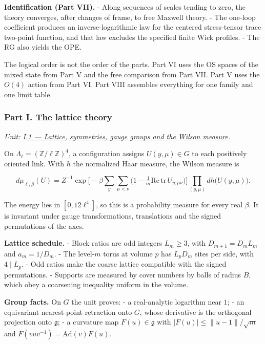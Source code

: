 \documentclass[
  letterpaper,
  11pt]{article}
\begin{document}
\textbf{Identification (Part VII).} - Along sequences of scales tending
to zero, the theory converges, after changes of frame, to free Maxwell
theory. - The one-loop coefficient produces an inverse-logarithmic law
for the centered stress-tensor trace two-point function, and that law
excludes the specified finite Wick profiles. - The RG also yields the
OPE.

The logical order is not the order of the parts. Part VI uses the OS
spaces of the mixed state from Part V and the free comparison from Part
VII. Part V uses the \(O(4)\) action from Part VI. Part VIII assembles
everything for one family and one limit table.

\subsubsection{Part I. The lattice
theory}\label{part-i.-the-lattice-theory}

\emph{Unit:
\href{https://github.com/scottnarmstrong/yang-mills-informalization/blob/main/outline/units/I-1.md}{I.1
--- Lattice, symmetries, gauge groups and the Wilson measure}.}

On \(\Lambda_\ell=(\mathbb Z/\ell\mathbb Z)^4\), a configuration assigns
\(U(y,\mu)\in G\) to each positively oriented link. With \(h\) the
normalized Haar measure, the Wilson measure is

\[d\mu_{\ell,\beta}(U)=Z^{-1}\exp\Big[-\beta\sum_y\sum_{\mu<\nu}\big(1-\tfrac1m\mathrm{Re}\,\mathrm{tr}\,U_{y;\mu\nu}\big)\Big]\prod_{(y,\mu)}dh\big(U(y,\mu)\big).\]

The energy lies in \([0,12\ell^4]\), so this is a probability measure
for every real \(\beta\). It is invariant under gauge transformations,
translations and the signed permutations of the axes.

\textbf{Lattice schedule.} - Block ratios are odd integers \(L_m\ge3\),
with \(D_{m+1}=D_mL_m\) and \(a_m=1/D_m\). - The level-\(m\) torus at
volume \(p\) has \(L_pD_m\) sites per side, with \(4\mid L_p\). - Odd
ratios make the coarse lattice compatible with the signed permutations.
- Supports are measured by cover numbers by balls of radius \(B\), which
obey a coarsening inequality uniform in the volume.

\textbf{Group facts.} On \(G\) the unit proves: - a real-analytic
logarithm near \(1\); - an equivariant nearest-point retraction onto
\(G\), whose derivative is the orthogonal projection onto
\(\mathfrak g\); - a curvature map \(F(u)\in\mathfrak g\) with
\(|F(u)|\le\lVert u-1\rVert/\sqrt m\) and
\(F(vuv^{-1})=\mathrm{Ad}(v)F(u)\).
\end{document}
